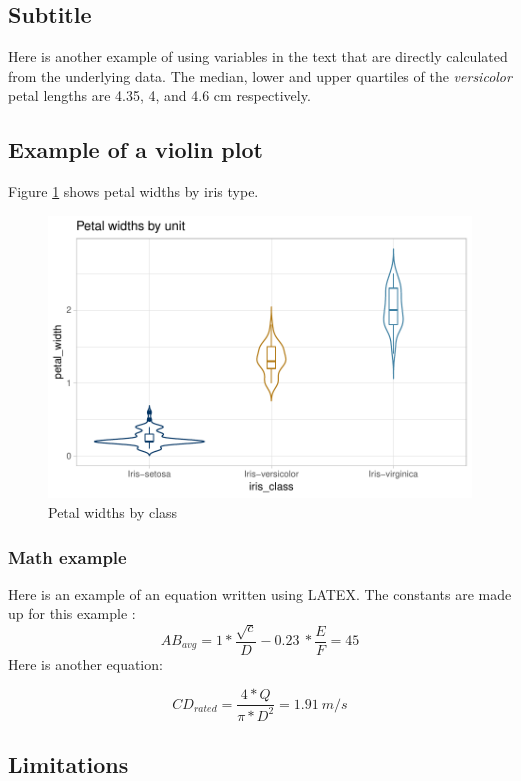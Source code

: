 \documentclass[]{elsarticle} %
\makeatletter
\def\maxwidth{\ifdim\Gin@nat@width>\linewidth\linewidth
\else\Gin@nat@width\fi}
\let\Oldincludegraphics\includegraphics
\renewcommand{\includegraphics}[1]{\Oldincludegraphics[width=\maxwidth]{#1}}
\makeatother
\begin{document}
\subsection{Subtitle}\label{subtitle}

Here is another example of using variables in the text that are directly
calculated from the underlying data. The median, lower and upper
quartiles of the \emph{versicolor} petal lengths are 4.35, 4, and 4.6 cm
respectively.

\subsection{Example of a violin plot}\label{example-of-a-violin-plot}

Figure \ref{fig:petalwidths} shows petal widths by iris type.

\begin{figure}
\centering
\includegraphics{Manuscript_files/figure-latex/petalwidths-1.pdf}
\caption{\label{fig:petalwidths}Petal widths by class}
\end{figure}

\subsubsection{Math example}\label{math-example}

Here is an example of an equation written using LATEX. The constants are
made up for this example :
\[AB_{avg} = 1 * \frac{\sqrt c}{D} - 0.23\ * \frac{E}{F}  = 45\] Here is
another equation:

\[ CD_{rated} = \frac{4*Q}{\pi*D^2} = 1.91~m/s\]

\subsection{Limitations}\label{limitations}
\end{document}
